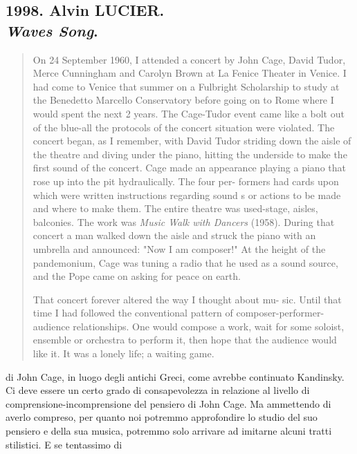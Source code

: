 
\subsection*{1998. Alvin LUCIER. \\ \emph{Waves Song}.}

\begin{quote}
	On 24 September 1960, I attended a concert by John Cage, David Tudor, Merce Cunningham and Carolyn Brown at La
	Fenice Theater in Venice. I had come to Venice that summer on a Fulbright Scholarship to study at the Benedetto
	Marcello Conservatory before going on to Rome where I would spent the next 2 years. The Cage-Tudor event came
	like a bolt out of the blue-all the protocols of the concert situation were violated.
	The concert began, as I remember, with David Tudor striding down the aisle of the theatre and diving under
	the piano, hitting the underside to make the first sound of the concert. Cage made an appearance playing
	a piano that rose up into the pit hydraulically. The four per- formers had cards upon which were written instructions
	regarding sound s or actions to be made and where to make them. The entire theatre was used-stage, aisles, balconies.
	The work was \emph{Music Walk with Dancers} (1958). During that concert a man walked down the aisle and struck the piano
	with an umbrella and announced: "Now I am composer!" At the height of the pandemonium, Cage was tuning a radio
	that he used as a sound source, and the Pope came on asking for peace on earth.

	That concert forever altered the way I thought about mu- sic. Until that time I had followed the conventional pattern of
	composer-performer-audience relationships. One would compose a work, wait for some soloist, ensemble or orchestra to perform it, then hope that the audience would like it. It was a lonely life; a waiting game.
\end{quote}

di John Cage, in luogo degli antichi Greci, come avrebbe continuato Kandinsky.
Ci deve essere un certo grado di consapevolezza in relazione al livello di
comprensione-incomprensione del pensiero di John Cage. Ma ammettendo di
averlo compreso, per quanto noi potremmo approfondire lo studio del suo
pensiero e della sua musica, potremmo solo arrivare ad imitarne alcuni tratti
stilistici. E se tentassimo di

